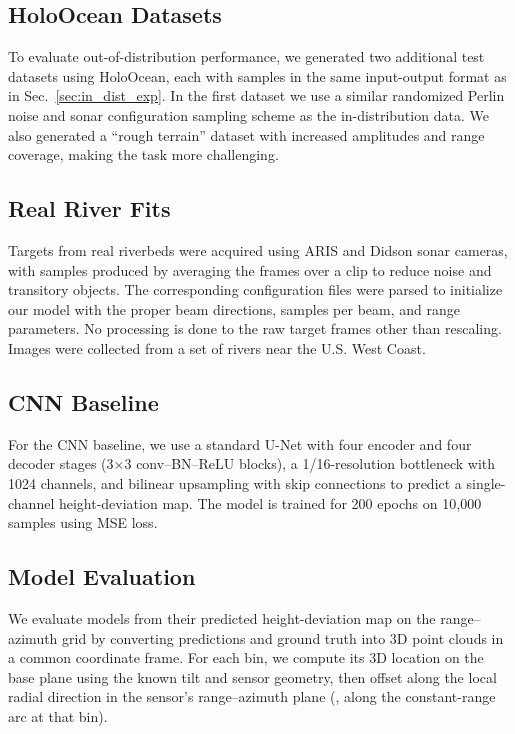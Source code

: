 \subsection{HoloOcean Datasets}
To evaluate out-of-distribution performance, we generated two additional test datasets using HoloOcean, each with samples in the same input-output format as in Sec.~\ref{sec:in_dist_exp}. In the first dataset we use a similar randomized Perlin noise and sonar configuration sampling scheme as the in-distribution data. We also generated a ``rough terrain'' dataset with increased amplitudes and range coverage, making the task more challenging. 

\subsection{Real River Fits}
Targets from real riverbeds were acquired using ARIS and Didson sonar cameras, with samples produced by averaging the frames over a clip to reduce noise and transitory objects. The corresponding configuration files were parsed to initialize our model with the proper beam directions, samples per beam, and range parameters. No processing is done to the raw target frames other than rescaling. Images were collected from a set of rivers near the U.S. West Coast.

\subsection{CNN Baseline}
For the CNN baseline, we use a standard U-Net with four encoder and four decoder stages (3$\times$3 conv--BN--ReLU blocks), a 1/16-resolution bottleneck with 1024 channels, and bilinear upsampling with skip connections to predict a single-channel height-deviation map. The model is trained for 200 epochs on 10{,}000 samples using MSE loss.

\subsection{Model Evaluation}
\label{sec:model_eval}

We evaluate models from their predicted height-deviation map on the range--azimuth grid by converting predictions and ground truth into 3D point clouds in a common coordinate frame. For each bin, we compute its 3D location on the base plane using the known tilt and sensor geometry, then offset along the local radial direction in the sensor's range–azimuth plane (\ie, along the constant-range arc at that bin).

